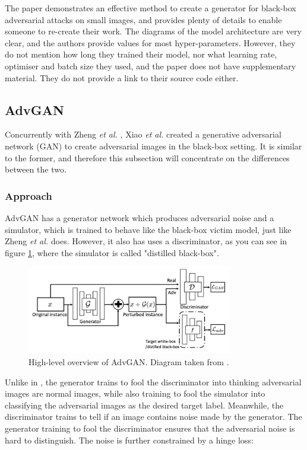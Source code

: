 The paper demonstrates an effective method to create a generator for black-box adversarial attacks on small images, and provides plenty of details to enable someone to re-create their work. The diagrams of the model architecture are very clear, and the authors provide values for most hyper-parameters. However, they do not mention how long they trained their model, nor what learning rate, optimiser and batch size they used, and the paper does not have supplementary material. They do not provide a link to their source code either.

\subsection{AdvGAN}
    \label{subsec:AdvGAN}
    
Concurrently with Zheng \textit{et al.} \cite{zheng_black_box_GAN}, Xiao \textit{et al.} \cite{advGAN} created a generative adversarial network (GAN) to create adversarial images in the black-box setting. It is similar to the former, and therefore this subsection will concentrate on the differences between the two.

\subsubsection{Approach}

AdvGAN has a generator network which produces adversarial noise and a simulator, which is trained to behave like the black-box victim model, just like Zheng \textit{et al.} does. However, it also has uses a discriminator, as you can see in figure \ref{fig:advgan}, where the simulator is called "distilled black-box". 

\begin{figure}[h]
    \centering
    \includegraphics[width=0.8\textwidth]{graphics/advgan.PNG}
    \caption{High-level overview of AdvGAN. Diagram taken from \cite{advGAN}.}
    \label{fig:advgan}
\end{figure}

Unlike in \cite{zheng_black_box_GAN}, the generator trains to fool the discriminator into thinking adversarial images are normal images, while also training to fool the simulator into classifying the adversarial images as the desired target label. Meanwhile, the discriminator trains to tell if an image contains noise made by the generator. The generator training to fool the discriminator ensures that the adversarial noise is hard to distinguish. The noise is further constrained by a hinge loss:

